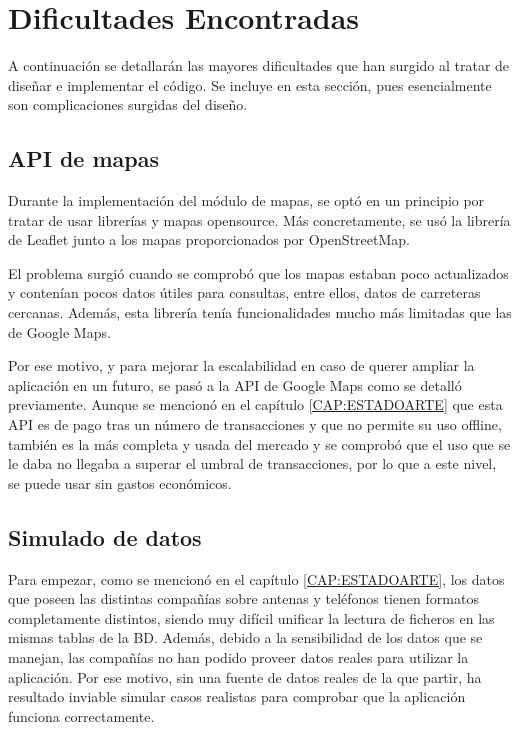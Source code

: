 \section{Dificultades Encontradas\label{SEC:DIFICULTAD}}
  A continuación se detallarán las mayores dificultades que han surgido al tratar de diseñar e implementar el código. Se incluye en esta sección, pues esencialmente son complicaciones surgidas del diseño.
  
  \subsection{API de mapas}
    Durante la implementación del módulo de mapas, se optó en un principio por tratar de usar librerías y mapas opensource. Más concretamente, se usó la librería de Leaflet junto a los mapas proporcionados por OpenStreetMap.
    
    El problema surgió cuando se comprobó que los mapas estaban poco actualizados y contenían pocos datos útiles para consultas, entre ellos, datos de carreteras cercanas. Además, esta librería tenía funcionalidades mucho más limitadas que las de Google Maps.
    
    Por ese motivo, y para mejorar la escalabilidad en caso de querer ampliar la aplicación en un futuro, se pasó a la API de Google Maps como se detalló previamente. 
    Aunque se mencionó en el capítulo \ref{CAP:ESTADOARTE} que esta API es de pago tras un número de transacciones y que no permite su uso offline, también es la más completa y usada del mercado y se comprobó que el uso que se le daba no llegaba a superar el umbral de transacciones, por lo que a este nivel, se puede usar sin gastos económicos.
    
    
   \subsection{Simulado de datos}
    Para empezar, como se mencionó en el capítulo \ref{CAP:ESTADOARTE}, los datos que poseen las distintas compañías sobre antenas y teléfonos tienen formatos completamente distintos, siendo muy difícil unificar la lectura de ficheros en las mismas tablas de la BD.
    Además, debido a la sensibilidad de los datos que se manejan, las compañías no han podido proveer datos reales para utilizar la aplicación. 
    Por ese motivo, sin una fuente de datos reales de la que partir, ha resultado inviable simular casos realistas para comprobar que la aplicación funciona correctamente. 
    
